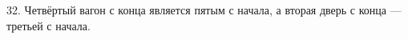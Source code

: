 32. Четвёртый вагон с конца является пятым с начала, а вторая дверь с конца --- третьей с начала.\\

